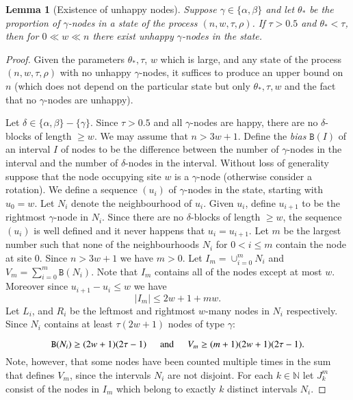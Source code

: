 \documentclass[11pt]{article}
\theoremstyle{plain}
\newtheorem{lem}[thm]{Lemma}
\numberwithin{equation}{subsection}
\newcommand{\Nat}{\mathbb{N}}
\newcommand{\bias}[1]{\mathtt{B}(#1)}
\begin{document}
\begin{lem}[Existence of unhappy nodes]\label{taurhostarmt1}
Suppose $\gamma\in\{\alpha, \beta\}$
and
let $\theta_{\ast}$ be the proportion 
of $\gamma$-nodes in a state of the  process $(n, w, \tau, \rho)$.
If  $\tau>0.5$ and  $\theta_{\ast}<\tau$, then for  $0\ll w \ll n$ 
there exist unhappy $\gamma$-nodes 
in the state.
\end{lem}
\begin{proof}
Given the parameters $\theta_{\ast}, \tau$,  $w$ which is large,  
and any state 
of  the process $(n, w, \tau, \rho)$ with no unhappy $\gamma$-nodes,
it suffices to produce an upper bound on $n$ (which does not depend on the particular state but only $\theta_{\ast},\tau, w$ and the fact that no $\gamma$-nodes are unhappy).


Let $\delta\in \{\alpha, \beta\} -\{\gamma\}$.
Since $\tau>0.5$  and all
$\gamma$-nodes are happy, there
are no $\delta$-blocks of length $\geq w$.
We may assume that $n> 3w+1$. 
Define the {\em bias} $\bias{I}$ of an interval $I$ of nodes 
to be the difference between the number of
$\gamma$-nodes in the interval and the number of $\delta$-nodes in the interval.
Without loss of generality suppose that the node occupying site $w$ is a
$\gamma$-node (otherwise consider a rotation).
We define a sequence $(u_i)$ of $\gamma$-nodes in the state, 
starting with $u_0=w$. Let $N_i$ denote the neighbourhood of $u_i$.
Given $u_i$, define $u_{i+1}$ to be the rightmost 
$\gamma$-node in $N_i$. 
Since there are no $\delta$-blocks of length
$\geq w$, the sequence $(u_i)$ 
is well defined and it never happens that $u_i=u_{i+1}$. Let $m$ be the largest number such that none of the neighbourhoods $N_i$ for $0<i\leq m$ contain the node at site 0. 
Since $n> 3w+1$ we have $m>0$.
Let $I_m= \cup_{i=0}^m N_i$ and $V_m=\sum_{i=0}^m \bias{N_i}$.
Note that $I_m$ contains all of the nodes except at most $w$. 
Moreover since $u_{i+1}-u_i\leq w$ we have
\begin{equation}\label{eq:bouleIm}
|I_m|\leq 2w+1+mw.
\end{equation}
Let $L_i$,  and $R_i$ be the leftmost and rightmost 
$w$-many nodes in $N_i$ respectively.
Since  $N_i$ contains at least $\tau(2w+1)$ nodes of type $\gamma$:
 
\begin{equation}\label{eq:vlowbou}
\bias{N_i}\geq (2w+1) (2\tau-1)\hspace{0.5cm}\textrm{and}
\hspace{0.5cm} V_m\geq (m+1)(2w+1) (2\tau-1).
\end{equation}
Note, however,  that some nodes have been 
counted multiple times in the sum that defines $V_m$, since
the intervals $N_i$ are not disjoint. For each 
$k\in\Nat$ let $J^m_k$ consist of the nodes in $I_m$ which belong to 
exactly $k$ distinct intervals $N_i$.


\end{proof}
\end{document}
